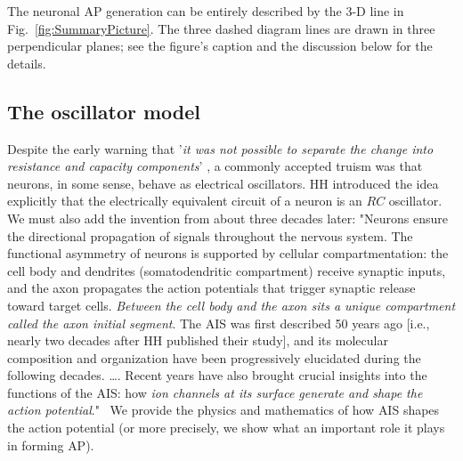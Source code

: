 The neuronal \gls{AP} generation can be entirely described  
by the 3-D line in 
Fig.~\ref{fig:SummaryPicture}. The three dashed diagram lines are drawn in 
three perpendicular planes; see the figure's caption and the discussion below for the details.


\subsection{The oscillator model\label{sec:OscillatorModel}}

Despite the early warning that '\textit{it was not possible to separate the change into
	resistance and capacity components}' \cite{COLE_CURTIS_IMPEDANCE:1939},
a commonly accepted truism was that neurons, in some sense, behave
as electrical oscillators.
\gls{HH} introduced the idea explicitly that the electrically equivalent circuit
of a neuron is an $RC$ oscillator.
We must also add the invention from about three decades later: "Neurons ensure the directional propagation of signals throughout the nervous system.
The functional asymmetry of neurons is supported by cellular compartmentation: the cell body and dendrites (somatodendritic compartment) receive synaptic inputs,
and the axon propagates the action potentials that trigger synaptic release toward target cells.
\textit{Between the cell body and the axon sits a unique compartment called the axon initial segment}.
The \gls{AIS} was first described 50 years ago [i.e., nearly two decades after \gls{HH} published their study], and its molecular composition
and organization have been progressively elucidated during the following decades. \dots.
Recent years have also brought crucial insights into the functions of the \gls{AIS}:
how \textit{ion channels at its surface generate and shape the action potential}."~\cite{AIS_Updated_Viewpoint:2018}
We provide the physics and mathematics of how \gls{AIS} shapes
the action potential (or more precisely, we show what an important role it plays in forming \gls{AP}).

